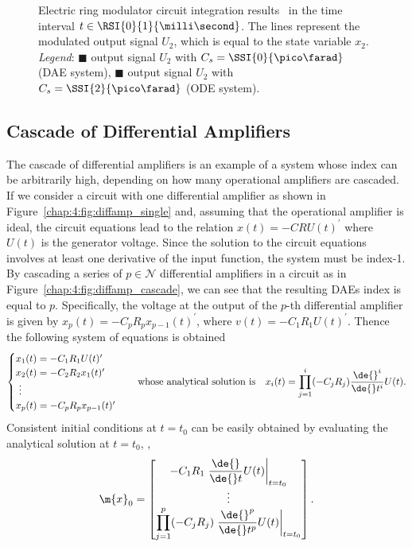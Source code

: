 \begin{figure}[htb]
  \centering
  \small{}
  \caption{Electric ring modulator circuit integration results~\cite{lioen1998test, mazzia2008test} in the time interval $t \in \RSI{0}{1}{\milli\second}$. The lines represent the modulated output signal $U_2$, which is equal to the state variable $x_2$. \emph{Legend}: \textcolor{mycolor1}{$\blacksquare$} output signal $U_2$ with $C_s = \SSI{0}{\pico\farad}$ (\ac{DAE} system), \textcolor{mycolor2}{$\blacksquare$} output signal $U_2$ with $C_s = \SSI{2}{\pico\farad}$ (\ac{ODE} system).}
  \label{chap4:fig:ring_modulator_results}
\end{figure}

\subsection{Cascade of Differential Amplifiers}

The cascade of differential amplifiers is an example of a system whose index can be arbitrarily high, depending on how many operational amplifiers are cascaded. If we consider a circuit with one differential amplifier as shown in Figure~\ref{chap:4:fig:diffamp_single} and, assuming that the operational amplifier is ideal, the circuit equations lead to the relation $x(t) = -C R U(t)^{\prime}$ where $U(t)$ is the generator voltage. Since the solution to the circuit equations involves at least one derivative of the input function, the system must be index-1. By cascading a series of $p \in \mathcal{N}$ differential amplifiers in a circuit as in Figure~\ref{chap:4:fig:diffamp_cascade}, we can see that the resulting \acp{DAE} index is equal to $p$. Specifically, the voltage at the output of the $p$-th differential amplifier is given by $x_p(t) = -C_p R_p x_{p-1}(t)^{\prime}$, where $v(t) = -C_1 R_1 U(t)^{\prime}$. Thence the following system of equations is obtained
%
\begin{equation}
  \begin{cases}
    x_1(t) = -C_1 R_1 U(t)^{\prime} \\
    x_2(t) = -C_2 R_2 x_1(t)^{\prime} \\
    ~\vdots \\
    x_p(t) = -C_p R_p x_{p-1}(t)^{\prime}
  \end{cases}
  \quad \text{whose analytical solution is} \quad
  x_i(t) = \prod_{j=1}^{i} (-C_j R_j) \dfrac{\de{}^{i}}{\de{}t^{i}}U(t) \text{.}
\end{equation}
%
Consistent initial conditions at $t = t_0$ can be easily obtained by evaluating the analytical solution at $t = t_0$, \ie{},
%
\begin{equation}
  \m{x}_0 = \begin{bmatrix}
    -C_1 R_1 \left.\dfrac{\de{}}{\de{}t}U(t)\right|_{t=t_0} \\
    \vdots \\
    \displaystyle\prod_{j=1}^{p} (-C_j R_j) \left.\dfrac{\de{}^{p}}{\de{}t^{p}}U(t)\right|_{t=t_0}
  \end{bmatrix} \text{.}
\end{equation}

